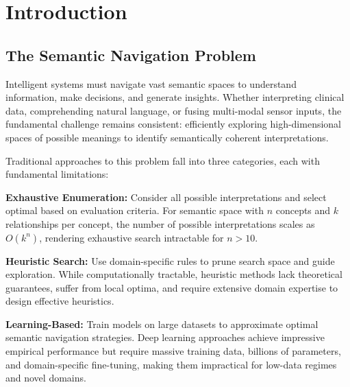 \documentclass[12pt,a4paper]{article}
\begin{document}
\begin{abstract}
The Semantic Maxwell Demon provides a theoretically grounded, practically implementable solution to the semantic exploration problem, with applications spanning artificial intelligence, clinical decision support, scientific literature analysis, and general-purpose semantic understanding systems. The framework's thermodynamic foundation ensures physical realizability while its empty dictionary architecture enables deployment without domain-specific training data or pre-stored semantic patterns.

\textbf{Keywords:} Semantic navigation, thermodynamic computing, information geometry, Bayesian inference, semantic compression, multi-modal analysis
\end{abstract}

\section{Introduction}

\subsection{The Semantic Navigation Problem}

Intelligent systems must navigate vast semantic spaces to understand information, make decisions, and generate insights. Whether interpreting clinical data, comprehending natural language, or fusing multi-modal sensor inputs, the fundamental challenge remains consistent: efficiently exploring high-dimensional spaces of possible meanings to identify semantically coherent interpretations.

Traditional approaches to this problem fall into three categories, each with fundamental limitations:

\textbf{Exhaustive Enumeration:} Consider all possible interpretations and select optimal based on evaluation criteria. For semantic space with $n$ concepts and $k$ relationships per concept, the number of possible interpretations scales as $O(k^n)$, rendering exhaustive search intractable for $n > 10$.

\textbf{Heuristic Search:} Use domain-specific rules to prune search space and guide exploration. While computationally tractable, heuristic methods lack theoretical guarantees, suffer from local optima, and require extensive domain expertise to design effective heuristics.

\textbf{Learning-Based:} Train models on large datasets to approximate optimal semantic navigation strategies. Deep learning approaches achieve impressive empirical performance but require massive training data, billions of parameters, and domain-specific fine-tuning, making them impractical for low-data regimes and novel domains.
\end{document}
